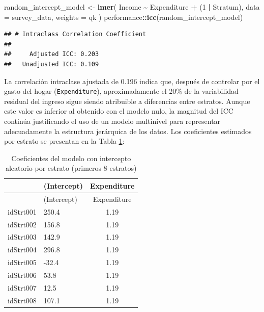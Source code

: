 \documentclass[
  spanish,
  12pt,
]{book}
\newenvironment{Shaded}{\begin{snugshade}}{\end{snugshade}}
\newcommand{\AttributeTok}[1]{\textcolor[rgb]{0.13,0.29,0.53}{#1}}
\newcommand{\DataTypeTok}[1]{\textcolor[rgb]{0.13,0.29,0.53}{#1}}
\newcommand{\DecValTok}[1]{\textcolor[rgb]{0.00,0.00,0.81}{#1}}
\newcommand{\FunctionTok}[1]{\textcolor[rgb]{0.13,0.29,0.53}{\textbf{#1}}}
\newcommand{\NormalTok}[1]{#1}
\newcommand{\OtherTok}[1]{\textcolor[rgb]{0.56,0.35,0.01}{#1}}
\newcommand{\SpecialCharTok}[1]{\textcolor[rgb]{0.81,0.36,0.00}{\textbf{#1}}}
\begin{document}
\begin{Shaded}
\begin{Highlighting}[]
\NormalTok{random\_intercept\_model }\OtherTok{\textless{}{-}} \FunctionTok{lmer}\NormalTok{(}
\NormalTok{  Income }\SpecialCharTok{\textasciitilde{}}\NormalTok{ Expenditure }\SpecialCharTok{+}\NormalTok{ (}\DecValTok{1} \SpecialCharTok{|}\NormalTok{ Stratum),}
  \AttributeTok{data =}\NormalTok{ survey\_data,}
  \AttributeTok{weights =}\NormalTok{ qk}
\NormalTok{)}
\NormalTok{performance}\SpecialCharTok{::}\FunctionTok{icc}\NormalTok{(random\_intercept\_model)}
\end{Highlighting}
\end{Shaded}

\begin{verbatim}
## # Intraclass Correlation Coefficient
## 
##     Adjusted ICC: 0.203
##   Unadjusted ICC: 0.109
\end{verbatim}

La correlación intraclase ajustada de 0.196 indica que, después de controlar por el gasto del hogar (\texttt{Expenditure}), aproximadamente el 20\% de la variabilidad residual del ingreso sigue siendo atribuible a diferencias entre estratos. Aunque este valor es inferior al obtenido con el modelo nulo, la magnitud del ICC continúa justificando el uso de un modelo multinivel para representar adecuadamente la estructura jerárquica de los datos. Los coeficientes estimados por estrato se presentan en la Tabla \ref{tab:tab-coef-intercepto-aleatorio}:

\begin{Shaded}
\end{Shaded}

\begin{longtable}[]{@{}llc@{}}
\caption{\label{tab:tab-coef-intercepto-aleatorio}Coeficientes del modelo con intercepto aleatorio por estrato (primeros 8 estratos)}\tabularnewline
\toprule\noalign{}
& (Intercept) & Expenditure \\
\midrule\noalign{}
\endfirsthead
\toprule\noalign{}
& (Intercept) & Expenditure \\
\midrule\noalign{}
\endhead
\bottomrule\noalign{}
\endlastfoot
idStrt001 & 250.4 & 1.19 \\
idStrt002 & 156.8 & 1.19 \\
idStrt003 & 142.9 & 1.19 \\
idStrt004 & 296.8 & 1.19 \\
idStrt005 & -32.4 & 1.19 \\
idStrt006 & 53.8 & 1.19 \\
idStrt007 & 12.5 & 1.19 \\
idStrt008 & 107.1 & 1.19 \\
\end{longtable}
\end{document}
